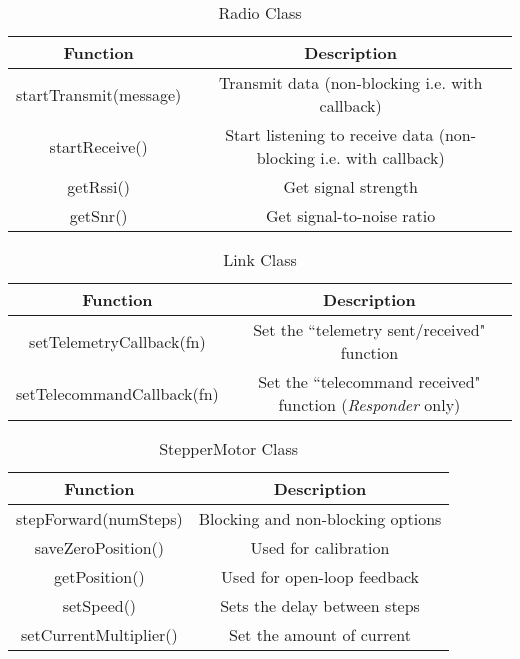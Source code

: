\begin{table}[!htb]
  \centering
  \caption{Radio Class}
  \renewcommand{\arraystretch}{1.2}
  \begin{tabular}{ |c|c| }
  \hline
  \textbf{Function}        & \textbf{Description}    \\
  \hline
    startTransmit(message)              & Transmit data (non-blocking i.e. with callback) \\
    startReceive()                      & Start listening to receive data (non-blocking i.e. with callback) \\
    getRssi()                           & Get signal strength \\
    getSnr()                            & Get signal-to-noise ratio \\
  \hline
  \end{tabular}
  \label{tab:radioUML}
\end{table}

\begin{table}[!htb]
  \centering
  \caption{Link Class}
  \renewcommand{\arraystretch}{1.2}
  \begin{tabular}{ |c|c| }
  \hline
  \textbf{Function}        & \textbf{Description}    \\
  \hline
  setTelemetryCallback(fn)                    & Set the ``telemetry sent/received" function  \\
  setTelecommandCallback(fn)                  & Set the ``telecommand received" function (\textit{Responder} only) \\
  \hline
  \end{tabular}
  \label{tab:linkUML}
\end{table}

\begin{table}[!htb]
  \centering
  \caption{StepperMotor Class}
  \renewcommand{\arraystretch}{1.2}
  \begin{tabular}{ |c|c| }
  \hline
  \textbf{Function}        & \textbf{Description}    \\
  \hline
    stepForward(numSteps)         & Blocking and non-blocking options \\
    saveZeroPosition()            & Used for calibration \\
    getPosition()                 & Used for open-loop feedback \\
    setSpeed()                    & Sets the delay between steps \\
    setCurrentMultiplier()        & Set the amount of current \\
  \hline
  \end{tabular}
  \label{tab:stepperMotorUML}
\end{table}


